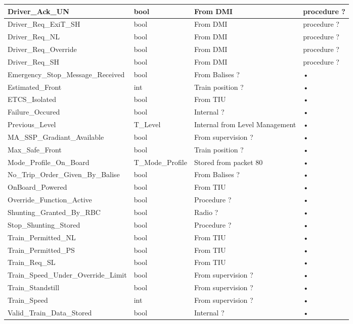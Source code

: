 \begin{center}
\begin{supertabular}{| m{6cm} | m{3cm} | m{3cm} | m{3cm} |}
\hline 
Driver\_Ack\_UN & bool & From DMI & procedure ?  \\ 
\hline 
Driver\_Req\_ExiT\_SH & bool & From DMI & procedure ?  \\ 
\hline 
Driver\_Req\_NL & bool & From DMI & procedure ?  \\ 
\hline 
Driver\_Req\_Override & bool & From DMI & procedure ?  \\ 
\hline 
Driver\_Req\_SH & bool & From DMI & procedure ?  \\ 
\hline 
Emergency\_Stop\_Message\_Received & bool & From Balises ?& • \\ 
\hline 
Estimated\_Front & int & Train position ?& • \\ 
\hline 
ETCS\_Isolated & bool & From TIU& • \\ 
\hline 
Failure\_Occured & bool & Internal ?& • \\ 
\hline 
Previous\_Level & 	T\_Level	& Internal from Level Management& • \\ 
\hline 
MA\_SSP\_Gradiant\_Available & bool & From supervision ?& • \\ 
\hline 
Max\_Safe\_Front & bool & Train position ?& • \\ 
\hline 
Mode\_Profile\_On\_Board &	T\_Mode\_Profile &	Stored from  packet 80 & • \\ 
\hline 
No\_Trip\_Order\_Given\_By\_Balise & bool & From Balises ?& • \\ 
\hline 
OnBoard\_Powered & bool & From TIU& • \\ 
\hline 
Override\_Function\_Active & bool & Procedure ?& • \\ 
\hline 
Shunting\_Granted\_By\_RBC & bool & Radio ?& • \\ 
\hline 
Stop\_Shunting\_Stored & bool & Procedure ?& • \\ 
\hline 
Train\_Permitted\_NL & bool & From TIU& • \\ 
\hline 
Train\_Permitted\_PS & bool & From TIU & • \\ 
\hline 
Train\_Req\_SL & bool & From TIU& • \\ 
\hline 
Train\_Speed\_Under\_Override\_Limit & bool & From supervision ?& • \\ 
\hline 
Train\_Standstill & bool & From supervision ?& • \\ 
\hline 
Train\_Speed & int & From supervision ?& • \\ 
\hline 
Valid\_Train\_Data\_Stored & bool & Internal ?& • \\ 
\hline 
\end{supertabular} 

\end{center}

